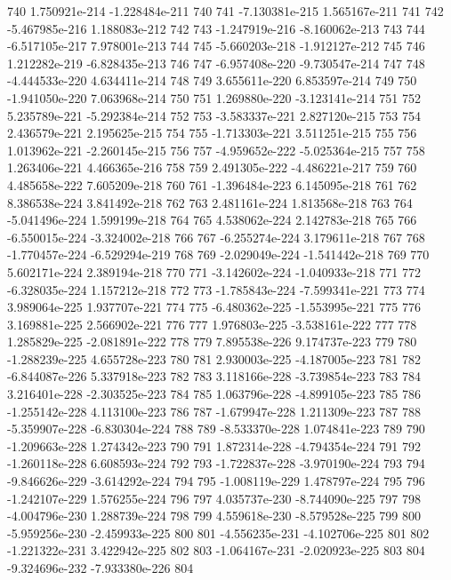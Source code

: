 \documentclass{article}
\begin{document}
\begin{Schunk}
\begin{Soutput}
740   1.750921e-214 -1.228484e-211  740
741  -7.130381e-215  1.565167e-211  741
742  -5.467985e-216  1.188083e-212  742
743  -1.247919e-216 -8.160062e-213  743
744  -6.517105e-217  7.978001e-213  744
745  -5.660203e-218 -1.912127e-212  745
746   1.212282e-219 -6.828435e-213  746
747  -6.957408e-220 -9.730547e-214  747
748  -4.444533e-220  4.634411e-214  748
749   3.655611e-220  6.853597e-214  749
750  -1.941050e-220  7.063968e-214  750
751   1.269880e-220 -3.123141e-214  751
752   5.235789e-221 -5.292384e-214  752
753  -3.583337e-221  2.827120e-215  753
754   2.436579e-221  2.195625e-215  754
755  -1.713303e-221  3.511251e-215  755
756   1.013962e-221 -2.260145e-215  756
757  -4.959652e-222 -5.025364e-215  757
758   1.263406e-221  4.466365e-216  758
759   2.491305e-222 -4.486221e-217  759
760   4.485658e-222  7.605209e-218  760
761  -1.396484e-223  6.145095e-218  761
762   8.386538e-224  3.841492e-218  762
763   2.481161e-224  1.813568e-218  763
764  -5.041496e-224  1.599199e-218  764
765   4.538062e-224  2.142783e-218  765
766  -6.550015e-224 -3.324002e-218  766
767  -6.255274e-224  3.179611e-218  767
768  -1.770457e-224 -6.529294e-219  768
769  -2.029049e-224 -1.541442e-218  769
770   5.602171e-224  2.389194e-218  770
771  -3.142602e-224 -1.040933e-218  771
772  -6.328035e-224  1.157212e-218  772
773  -1.785843e-224 -7.599341e-221  773
774   3.989064e-225  1.937707e-221  774
775  -6.480362e-225 -1.553995e-221  775
776   3.169881e-225  2.566902e-221  776
777   1.976803e-225 -3.538161e-222  777
778   1.285829e-225 -2.081891e-222  778
779   7.895538e-226  9.174737e-223  779
780  -1.288239e-225  4.655728e-223  780
781   2.930003e-225 -4.187005e-223  781
782  -6.844087e-226  5.337918e-223  782
783   3.118166e-228 -3.739854e-223  783
784   3.216401e-228 -2.303525e-223  784
785   1.063796e-228 -4.899105e-223  785
786  -1.255142e-228  4.113100e-223  786
787  -1.679947e-228  1.211309e-223  787
788  -5.359907e-228 -6.830304e-224  788
789  -8.533370e-228  1.074841e-223  789
790  -1.209663e-228  1.274342e-223  790
791   1.872314e-228 -4.794354e-224  791
792  -1.260118e-228  6.608593e-224  792
793  -1.722837e-228 -3.970190e-224  793
794  -9.846626e-229 -3.614292e-224  794
795  -1.008119e-229  1.478797e-224  795
796  -1.242107e-229  1.576255e-224  796
797   4.035737e-230 -8.744090e-225  797
798  -4.004796e-230  1.288739e-224  798
799   4.559618e-230 -8.579528e-225  799
800  -5.959256e-230 -2.459933e-225  800
801  -4.556235e-231 -4.102706e-225  801
802  -1.221322e-231  3.422942e-225  802
803  -1.064167e-231 -2.020923e-225  803
804  -9.324696e-232 -7.933380e-226  804

\end{Soutput}
\end{Schunk}
\end{document}
